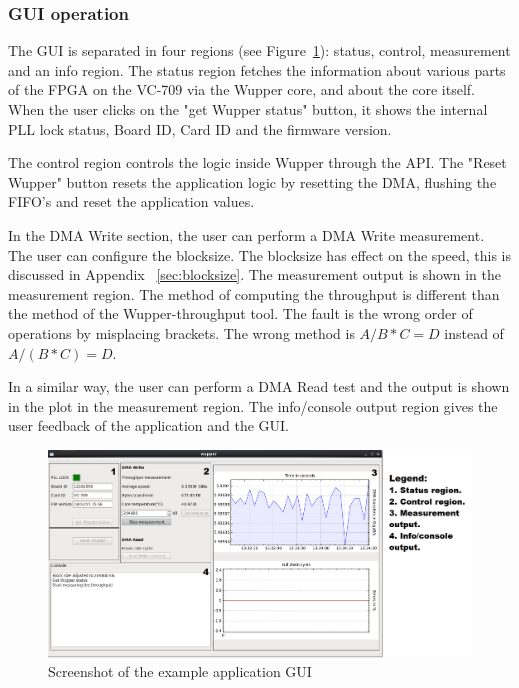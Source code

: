 \newpage
\subsubsection {GUI operation}

The GUI is separated in four regions (see Figure~\ref{fig:wuppergui}): status, control, measurement and an info region.
The status region fetches the information about various parts of the FPGA on the VC-709 via the Wupper core, and about the core itself. When the user clicks on the "get Wupper status" button, it shows the internal PLL lock status, Board ID, Card ID and the firmware version.

The control region controls the logic inside Wupper through the API. The "Reset Wupper" button resets the application logic by resetting the DMA, flushing the FIFO's and reset the application values. 

In the DMA Write section, the user can perform a DMA Write measurement. The user can configure the blocksize. The blocksize has effect on the speed, this is discussed in Appendix ~\ref{sec:blocksize}. The measurement output is shown in the measurement region. The method of computing the throughput is different than the method of the Wupper-throughput tool. The fault is the wrong order of operations by misplacing brackets. The wrong method is $A/B*C= D$ instead of $A/(B*C)= D$.

In a similar way, the user can perform a DMA Read test and the output is shown in the plot in the measurement region.
The info/console output region gives the user feedback of the application and the GUI.

\begin{figure}[h]
	\centering
	\includegraphics[width = 1 \textwidth]{figures/gui_printscreen_tb.PNG}	
	\caption{Screenshot of the example application GUI}
	\label{fig:wuppergui}
\end{figure}

 




\newpage










\newpage